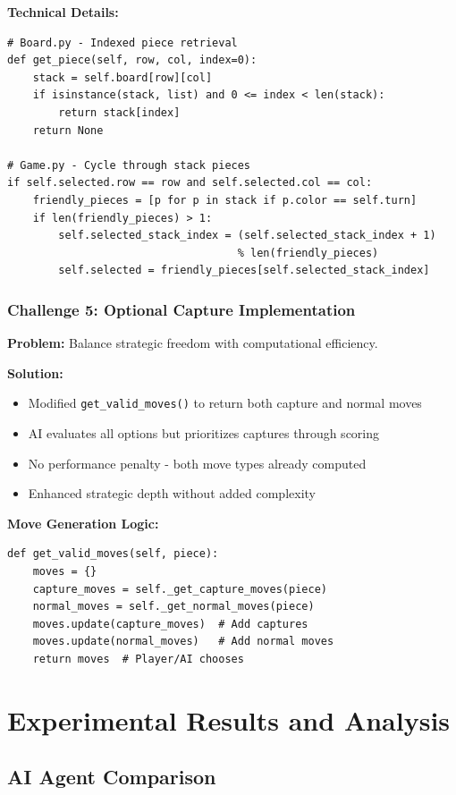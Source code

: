 \documentclass[12pt,a4paper]{article}
\begin{document}
\textbf{Technical Details:}
\begin{verbatim}
# Board.py - Indexed piece retrieval
def get_piece(self, row, col, index=0):
    stack = self.board[row][col]
    if isinstance(stack, list) and 0 <= index < len(stack):
        return stack[index]
    return None

# Game.py - Cycle through stack pieces
if self.selected.row == row and self.selected.col == col:
    friendly_pieces = [p for p in stack if p.color == self.turn]
    if len(friendly_pieces) > 1:
        self.selected_stack_index = (self.selected_stack_index + 1) 
                                    % len(friendly_pieces)
        self.selected = friendly_pieces[self.selected_stack_index]
\end{verbatim}

\subsubsection{Challenge 5: Optional Capture Implementation}

\textbf{Problem:} Balance strategic freedom with computational efficiency.

\textbf{Solution:}
\begin{itemize}
    \item Modified \texttt{get\_valid\_moves()} to return both capture and normal moves
    \item AI evaluates all options but prioritizes captures through scoring
    \item No performance penalty - both move types already computed
    \item Enhanced strategic depth without added complexity
\end{itemize}

\textbf{Move Generation Logic:}
\begin{verbatim}
def get_valid_moves(self, piece):
    moves = {}
    capture_moves = self._get_capture_moves(piece)
    normal_moves = self._get_normal_moves(piece)
    moves.update(capture_moves)  # Add captures
    moves.update(normal_moves)   # Add normal moves
    return moves  # Player/AI chooses
\end{verbatim}

\section{Experimental Results and Analysis}

\subsection{AI Agent Comparison}
\end{document}
